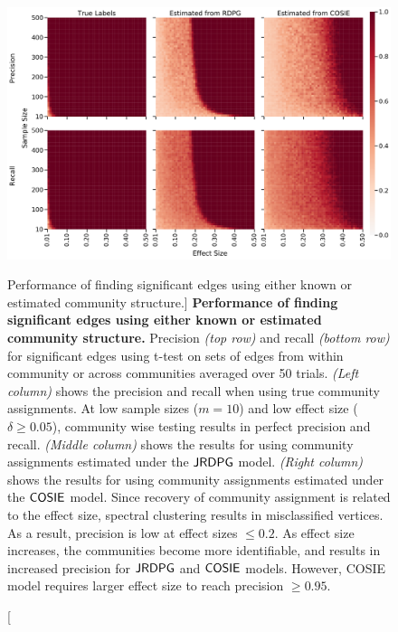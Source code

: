 \begin{figure}
    \includegraphics[width=.9\textwidth]{figures/dnd/exp3_final}
    \caption
    [Performance of finding significant edges using either known or estimated community structure.]
    {\textbf{Performance of finding significant edges using either known or estimated community structure.}
    Precision \textit{(top row)} and recall \textit{(bottom row)} for
    significant edges using t-test on sets of edges from within community or across communities averaged over 50 trials.
    \textit{(Left column)} shows the precision and recall when using true community assignments. At low sample sizes ($m =10$) and low effect size ($\delta \geq 0.05$), community wise testing results in perfect precision and recall.
    \textit{(Middle column)} shows the results for using community assignments estimated under the $\operatorname{\mathsf{JRDPG}}$ model. 
    \textit{(Right column)} shows the results for using community assignments estimated under the  $\operatorname{\mathsf{COSIE}}$ model. 
    Since recovery of community assignment is related to the effect size, spectral clustering results in misclassified vertices. As a result, precision is low at effect sizes $\leq 0.2$. As effect size increases, the communities become more identifiable, and results in increased precision for $\operatorname{\mathsf{JRDPG}}$ and $\operatorname{\mathsf{COSIE}}$ models. However, COSIE model requires larger effect size to reach precision $\geq 0.95$.
    }
    \label{fig:exp3}
\end{figure}

